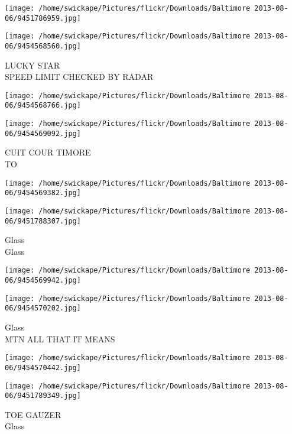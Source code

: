 \documentclass[10pt,letterpaper]{article}
\begin{document}
\texttt{[image: /home/swickape/Pictures/flickr/Downloads/Baltimore 2013-08-06/9451786959.jpg]}

\vspace{0.25in}
\texttt{[image: /home/swickape/Pictures/flickr/Downloads/Baltimore 2013-08-06/9454568560.jpg]}

LUCKY STAR\\
SPEED LIMIT CHECKED BY RADAR\\
\pagebreak

\texttt{[image: /home/swickape/Pictures/flickr/Downloads/Baltimore 2013-08-06/9454568766.jpg]}

\vspace{0.25in}
\texttt{[image: /home/swickape/Pictures/flickr/Downloads/Baltimore 2013-08-06/9454569092.jpg]}

CUIT COUR TIMORE\\
TO\\
\pagebreak

\texttt{[image: /home/swickape/Pictures/flickr/Downloads/Baltimore 2013-08-06/9454569382.jpg]}

\vspace{0.25in}
\texttt{[image: /home/swickape/Pictures/flickr/Downloads/Baltimore 2013-08-06/9451788307.jpg]}

Glass\\
Glass\\
\pagebreak

\texttt{[image: /home/swickape/Pictures/flickr/Downloads/Baltimore 2013-08-06/9454569942.jpg]}

\vspace{0.25in}
\texttt{[image: /home/swickape/Pictures/flickr/Downloads/Baltimore 2013-08-06/9454570202.jpg]}

Glass\\
MTN ALL THAT IT MEANS\\
\pagebreak

\texttt{[image: /home/swickape/Pictures/flickr/Downloads/Baltimore 2013-08-06/9454570442.jpg]}

\vspace{0.25in}
\texttt{[image: /home/swickape/Pictures/flickr/Downloads/Baltimore 2013-08-06/9451789349.jpg]}

TOE GAUZER\\
Glass\\
\pagebreak
\end{document}
